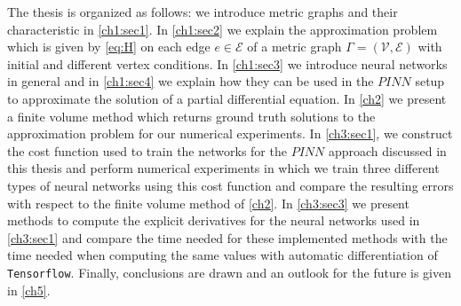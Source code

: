 The thesis is organized as follows: we introduce metric graphs and their characteristic in \cref{ch1:sec1}. In \cref{ch1:sec2} we explain the approximation problem which is given by \cref{eq:H} on each edge $e \in \mathcal{E}$ of a metric graph $\Gamma = \left( \mathcal{V}, \mathcal{E}\right)$ with initial and different vertex conditions. In \cref{ch1:sec3} we introduce neural networks in general and in \cref{ch1:sec4} we explain how they can be used in the $PINN$ setup to approximate the solution of a partial differential equation. In \cref{ch2} we present a finite volume method which returns ground truth solutions to the approximation problem for our numerical experiments. In \cref{ch3:sec1}, we construct the cost function used to train the networks for the $PINN$ approach discussed in this thesis and perform numerical experiments in which we train three different types of neural networks using this cost function and compare the resulting errors with respect to the finite volume method of \cref{ch2}. In \cref{ch3:sec3} we present methods to compute the explicit derivatives for the neural networks used in \cref{ch3:sec1} and compare the time needed for these implemented methods with the time needed when computing the same values with automatic differentiation of \lstinline!Tensorflow!. Finally, conclusions are drawn and an outlook for the future is given in \cref{ch5}.